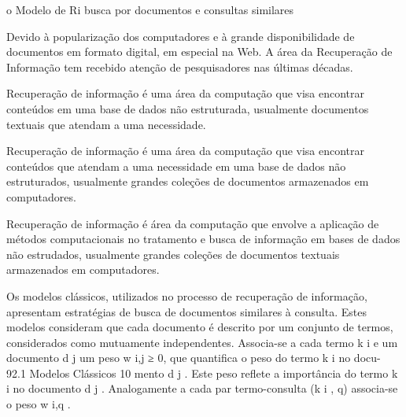 






o Modelo de Ri busca por documentos e consultas similares


Devido à popularização dos computadores e à grande disponibilidade de documentos em formato digital, em especial na Web. A área da Recuperação de Informação tem recebido atenção de pesquisadores nas últimas décadas.



Recuperação de informação é uma área da computação que visa encontrar conteúdos em uma base de dados não estruturada, usualmente documentos textuais que atendam a uma necessidade. 


Recuperação de informação é uma área da computação que visa encontrar conteúdos que atendam a uma necessidade em uma base de dados não estruturados, usualmente grandes coleções de documentos armazenados em computadores.


Recuperação de informação é área da computação que envolve a aplicação de métodos computacionais no tratamento e busca de informação em bases de dados não estrudados, usualmente grandes coleções de documentos textuais armazenados em computadores.







Os modelos clássicos, utilizados no processo de recuperação de informação, apresentam estratégias de busca de documentos similares à consulta. Estes modelos consideram que cada documento é descrito por um conjunto de termos, considerados como mutuamente independentes. Associa-se a cada termo k i e um documento d j um peso w i,j ≥ 0, que quantifica o peso do termo k i no docu- 92.1 Modelos Clássicos 10 mento d j . Este peso reflete a importância do termo k i no documento d j . Analogamente a cada par termo-consulta (k i , q) associa-se o peso w i,q .
